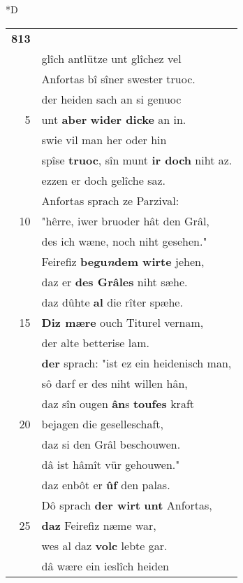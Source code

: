 \documentclass[8pt,a4paper,notitlepage]{article}
\begin{document}
\begin{table}[ht]
\begin{minipage}[t]{0.5\linewidth}
\small
\begin{center}*D
\end{center}
\begin{tabular}{rl}
\textbf{813} & \textbf{\begin{large}I\end{large}r} bêder vater \textbf{hiez} Frimutel.\\ 
 & glîch antlütze unt glîchez vel\\ 
 & Anfortas bî sîner swester truoc.\\ 
 & der heiden sach an si genuoc\\ 
5 & unt \textbf{aber} \textbf{wider dicke} an in.\\ 
 & swie vil man her oder hin\\ 
 & spîse \textbf{truoc}, sîn munt \textbf{ir doch} niht az.\\ 
 & ezzen er doch gelîche saz.\\ 
 & Anfortas sprach ze Parzival:\\ 
10 & "hêrre, iwer bruoder hât den Grâl,\\ 
 & des ich wæne, noch niht gesehen."\\ 
 & Feirefiz \textbf{begu\textit{n}dem wirte} jehen,\\ 
 & daz er \textbf{des Grâles} niht sæhe.\\ 
 & daz dûhte \textbf{al} die rîter spæhe.\\ 
15 & \textbf{Diz mære} ouch Titurel vernam,\\ 
 & der alte betterise lam.\\ 
 & \textbf{der} sprach: "ist ez ein heidenisch man,\\ 
 & sô darf er des niht willen hân,\\ 
 & daz sîn ougen \textbf{ân}s \textbf{toufes} kraft\\ 
20 & bejagen die geselleschaft,\\ 
 & daz si den Grâl beschouwen.\\ 
 & dâ ist hâmît vür gehouwen."\\ 
 & daz enbôt er \textbf{ûf} den palas.\\ 
 & Dô sprach \textbf{der wirt} \textbf{unt} Anfortas,\\ 
25 & \textbf{daz} Feirefiz næme war,\\ 
 & wes al daz \textbf{volc} lebte gar.\\ 
 & dâ wære ein ieslîch heiden\\ 

\end{tabular}
\end{minipage}
\end{table}
\end{document}
